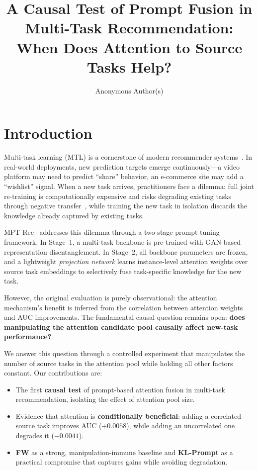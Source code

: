 \documentclass[sigconf,anonymous]{acmart}
\title{A Causal Test of Prompt Fusion in Multi-Task Recommendation: \\
       When Does Attention to Source Tasks Help?}
\author{Anonymous Author(s)}
\affiliation{%
  \institution{Anonymous Institution}
  \city{Beijing}
  \country{China}
}
\begin{document}
\maketitle

\section{Introduction}

Multi-task learning (MTL) is a cornerstone of modern recommender
systems~\cite{ma2018modeling,tang2020progressive}. In real-world deployments,
new prediction targets emerge continuously---a video platform may need to
predict ``share'' behavior, an e-commerce site may add a ``wishlist'' signal.
When a new task arrives, practitioners face a dilemma: full joint re-training
is computationally expensive and risks degrading existing tasks through negative
transfer~\cite{crawshaw2020multitask}, while training the new task in isolation
discards the knowledge already captured by existing tasks.

MPT-Rec~\cite{bai2025efficient} addresses this dilemma through a two-stage prompt
tuning framework. In Stage~1, a multi-task backbone is pre-trained with
GAN-based representation disentanglement. In Stage~2, all backbone parameters
are frozen, and a lightweight \emph{projection network} learns instance-level
attention weights over source task embeddings to selectively fuse
task-specific knowledge for the new task.

However, the original evaluation is purely observational: the attention
mechanism's benefit is inferred from the correlation between attention weights
and AUC improvements. The fundamental causal question remains open: \textbf{does
manipulating the attention candidate pool causally affect new-task
performance?}

We answer this question through a controlled experiment that manipulates the
number of source tasks in the attention pool while holding all other factors
constant. Our contributions are:
\begin{itemize}
  \item The first \textbf{causal test} of prompt-based attention fusion in
    multi-task recommendation, isolating the effect of attention pool size.
  \item Evidence that attention is \textbf{conditionally beneficial}:
    adding a correlated source task improves AUC ($+0.0058$), while adding an
    uncorrelated one degrades it ($-0.0041$).
  \item \textbf{FW} as a strong, manipulation-immune baseline and
    \textbf{KL-Prompt} as a practical compromise that captures gains while
    avoiding degradation.
\end{itemize}
\end{document}
